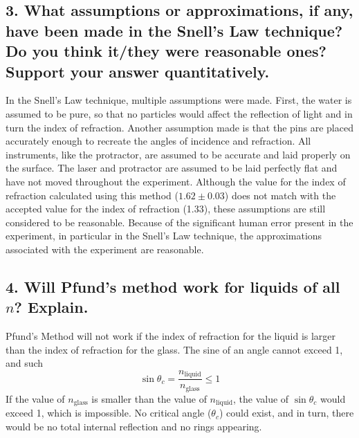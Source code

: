 \documentclass[12pt]{article}
\begin{document}
\subsection*{3. What assumptions or approximations, if any, have been made in the Snell's Law technique? Do you think it/they were reasonable ones? Support your answer quantitatively.}
    In the Snell's Law technique, multiple assumptions were made. First, the water is assumed to be pure, so that no particles would affect the reflection of light and in turn the index of refraction. Another assumption made is that the pins are placed accurately enough to recreate the angles of incidence and refraction. All instruments, like the protractor, are assumed to be accurate and laid properly on the surface. The laser and protractor are assumed to be laid perfectly flat and have not moved throughout the experiment.
    Although the value for the index of refraction calculated using this method ($1.62 \pm 0.03$) does not match with the accepted value for the index of refraction (1.33), these assumptions are still considered to be reasonable. Because of the significant human error present in the experiment, in particular in the Snell's Law technique, the approximations associated with the experiment are reasonable.
\subsection*{4. Will Pfund’s method work for liquids of all $n$? Explain.}
    Pfund's Method will not work if the index of refraction for the liquid is larger than the index of refraction for the glass. The sine of an angle cannot exceed 1, and such \[\sin\theta_c=\frac{n_{\text{liquid}}}{n_{\text{glass}}}\le 1\]
    If the value of $n_{\text{glass}}$ is smaller than the value of $n_{\text{liquid}}$, the value of $\sin\theta_c$ would exceed 1, which is impossible. No critical angle ($\theta_c$) could exist, and in turn, there would be no total internal reflection and no rings appearing.
\end{document}
